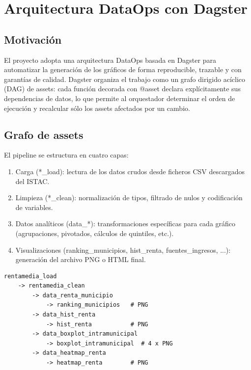 \documentclass[spanish,a4paper,12pt,oneside]{extreport}
\begin{document}
\chapter{Arquitectura DataOps con Dagster}

\section{Motivación}

El proyecto adopta una arquitectura DataOps basada en Dagster para automatizar la generación de los gráficos de forma reproducible, trazable y con garantías de calidad. Dagster organiza el trabajo como un grafo dirigido acíclico (DAG) de assets: cada función decorada con @asset declara explícitamente sus dependencias de datos, lo que permite al orquestador determinar el orden de ejecución y recalcular sólo los assets afectados por un cambio.

\section{Grafo de assets}

El pipeline se estructura en cuatro capas:

\begin{enumerate}
  \item Carga (*\_load): lectura de los datos crudos desde ficheros CSV descargados del ISTAC.
  \item Limpieza (*\_clean): normalización de tipos, filtrado de nulos y codificación de variables.
  \item Datos analíticos (data\_*): transformaciones específicas para cada gráfico (agrupaciones, pivotados, cálculos de quintiles, etc.).
  \item Visualizaciones (ranking\_municipios, hist\_renta, fuentes\_ingresos, ...): generación del archivo PNG o HTML final.
\end{enumerate}

\begin{lstlisting}[caption={Cadena de dependencias en Dagster (extracto).}]
rentamedia_load
    -> rentamedia_clean
        -> data_renta_municipio
            -> ranking_municipios   # PNG
        -> data_hist_renta
            -> hist_renta           # PNG
        -> data_boxplot_intramunicipal
            -> boxplot_intramunicipal  # 4 x PNG
        -> data_heatmap_renta
            -> heatmap_renta        # PNG
\end{lstlisting}
\end{document}

